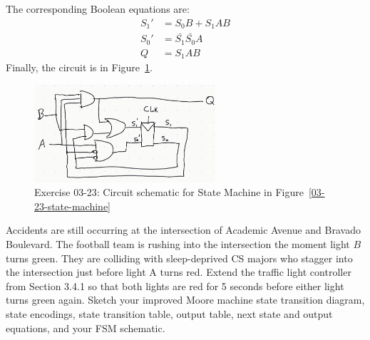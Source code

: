 \documentclass[12pt]{article}
\newenvironment{ex}[2][Exercise]{\begin{trivlist}
		\item[\hskip \labelsep {\bfseries #1}\hskip \labelsep {\bfseries #2.}]}{\end{trivlist}}
\newenvironment{sol}[1][Solution]{\begin{trivlist}
		\item[\hskip \labelsep {\bfseries #1:}]}{\end{trivlist}}
\begin{document}
\begin{sol}
\begin{center}
	\end{center}
	The corresponding Boolean equations are:
	\begin{align*}
		S_1'&=S_0B+S_1AB\\
		S_0'&=\bar{S_1}\bar{S_0}A\\
		Q&=S_1AB
	\end{align*}
	Finally, the circuit is in Figure~\ref{03-23-circuit-schematic}.
	\begin{figure}
		\centering
		\includegraphics[width=0.6\textwidth]{03-23-circuit-schematic}
		\caption{Exercise 03-23: Circuit schematic for State Machine in Figure~\ref{03-23-state-machine}}
		\label{03-23-circuit-schematic}
	\end{figure}
\end{sol}

\begin{ex}{3.24}
	Accidents are still occurring at the intersection of Academic
	Avenue and Bravado Boulevard. The football team is rushing into the
	intersection the moment light $B$ turns green. They are colliding
	with sleep-deprived CS majors who stagger into the intersection
	just before light A turns red. Extend the traffic light controller
	from Section 3.4.1 so that both lights are red for 5 seconds before
	either light turns green again. Sketch your improved Moore machine
	state transition diagram, state encodings, state transition table,
	output table, next state and output equations, and your FSM
	schematic.
\end{ex}
\end{document}
